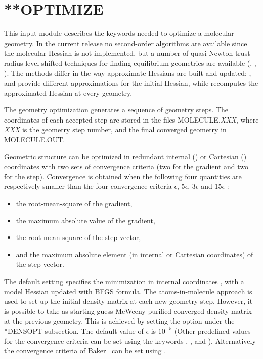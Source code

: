 \section{**OPTIMIZE}\label{sec:optimize}
This input module describes the keywords needed to optimize a molecular geometry.
In the current release no second-order algorithms are available since the molecular Hessian is not implemented, but
a number of quasi-Newton trust-radius level-shifted techniques for finding
equilibrium geometries are available (, , ).
The methods differ in the way approximate Hessians are built and updated: ,  and  provide different approximations for the initial Hessian, 
while  recomputes the approximated Hessian at every geometry.

The geometry optimization generates a sequence of geometry steps. The coordinates of each 
accepted step are stored in the files MOLECULE.\emph{XXX}, where \emph{XXX}
is the geometry step number, and the final converged geometry in MOLECULE.OUT.

Geometric structure can be optimized in redundant internal () or
Cartesian  () coordinates with two sets of convergence criteria (two for the gradient and two for the step).
Convergence is obtained when the following four quantities are respectively smaller than the four convergence criteria $\epsilon$, 5$\epsilon$, 3$\epsilon$ and 15$\epsilon$  \cite{NewConv}:
\begin{itemize}
\item the root-mean-square of the gradient, 
\item the maximum absolute value of the gradient, 
\item the root-mean square of the step vector,
\item and the maximum absolute element (in internal or Cartesian coordinates) of the step vector.
\end{itemize}


The default setting specifies the minimization in internal coordinates \cite{DaltonOpt}, with a model Hessian \cite{ModelHess} updated with BFGS formula. 
The atoms-in-molecule approach is used to set up the initial density-matrix at each new
geometry step.
However, it is possible to take as starting guess McWeeny-purified converged
density-matrix at the previous geometry. This is achieved by setting the  option under
the *DENSOPT subsection.
The default value of $\epsilon$ is $10^{-5}$
(Other predefined values for the convergence criteria can be set using the keywords , ,  and ).
Alternatively the convergence criteria of Baker~\cite{Baker} can be set using .


